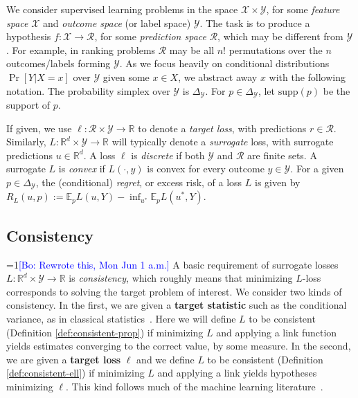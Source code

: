 \documentclass{article}
\newcommand{\Comments}{1}
\newcommand{\mynote}[2]{\ifnum\Comments=1\textcolor{#1}{#2}\fi}
\newcommand{\jessie}[1]{\mynote{purple}{[JF: #1]}}
\newcommand{\bo}[1]{\mynote{blue}{[Bo: #1]}}
\newcommand{\reals}{\mathbb{R}}
\newcommand{\simplex}{\Delta_\Y}
\newcommand{\supp}{\mathrm{supp}}
\newcommand{\E}{\mathbb{E}}
\newcommand{\R}{\mathcal{R}}
\newcommand{\X}{\mathcal{X}}
\newcommand{\Y}{\mathcal{Y}}
\newcommand{\exploss}[3]{\E_{#3} #1(#2,Y)}
\begin{document}
We consider supervised learning problems in the space $\X \times \Y$, for some \emph{feature space} $\X$ and \emph{outcome space} (or label space) $\Y$.
The task is to produce a hypothesis $f: \X \to \R$, for some \emph{prediction space} $\R$, which may be different from $\Y$.
For example, in ranking problems $\R$ may be all $n!$ permutations over the $n$ outcomes/labels forming $\Y$.
As we focus heavily on conditional distributions $\Pr[Y|X=x]$ over $\Y$ given some $x \in X$, we abstract away $x$ with the following notation.
The probability simplex over $\Y$ is $\simplex$.
For $p \in \simplex$, let $\supp(p)$ be the support of $p$.

If given, we use $\ell: \R \times \Y \to \reals$ to denote a \emph{target loss}, with predictions $r\in\R$.
Similarly, $L: \reals^d \times \Y \to \reals$ will typically denote a \emph{surrogate} loss, with surrogate predictions $u \in \reals^d$.
A loss $\ell$ is \emph{discrete} if both $\Y$ and $\R$ are finite sets.
A surrogate $L$ is \emph{convex} if $L(\cdot,y)$ is convex for every outcome $y \in \Y$.
For a given $p\in\simplex$, the (conditional) \emph{regret}, or excess risk, of a loss $L$ is given by $R_L(u,p) := \exploss{L}{u}{p} - \inf_{u^*} \exploss{L}{u^*}{p}$.




\subsection{Consistency} \label{subsec:consistency}

\bo{Rewrote this, Mon Jun 1 a.m.}
A basic requirement of surrogate losses $L: \reals^d \times \Y \to \reals$ is \emph{consistency}, which roughly means that minimizing $L$-loss corresponds to solving the target problem of interest.
We consider two kinds of consistency.
In the first, we are given a \textbf{target statistic} such as the conditional variance, as in classical statistics~\citep{fisher1922mathematical}.
Here we will define $L$ to be consistent (Definition \ref{def:consistent-prop}) if minimizing $L$ and applying a link function yields estimates converging to the correct value, by some measure.
In the second, we are given a \textbf{target loss} $\ell$ and we define $L$ to be consistent (Definition \ref{def:consistent-ell}) if minimizing $L$ and applying a link yields hypotheses minimizing $\ell$.
This kind follows much of the machine learning literature~\citep{zhang2004statistical,bartlett2006convexity,tewari2007consistency,steinwart2007compare,ramaswamy2016convex}.
\end{document}
